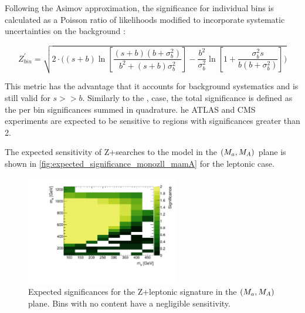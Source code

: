 
Following the Asimov approximation, the significance for individual bins is calculated as a Poisson ratio of likelihoods modified to incorporate systematic uncertainties on the background \cite{Cowan:2012}:  

\begin{equation}
\label{eq:significance_wsyst}
Z^\prime_{bin} = \sqrt{ 2 \cdot \bigg( (s+b) \ln[\frac{ (s+b) (b+\sigma_b^2) } {b^2 + (s+b) \sigma_b^2} ]- \frac{b^2}{\sigma_b^2} \ln[1 + \frac{\sigma_b^2 s}{b(b+\sigma_b^2)} ] \bigg) }
\end{equation}

This metric has the advantage that it accounts for background systematics and is still valid for $s >> b$.  
Similarly to the \monohbb, case, the total significance is defined as the per bin significances summed in quadrature.
 he ATLAS and CMS experiments are expected to be sensitive to regions with significances greater than 2.
 
The expected sensitivity of Z+\MET searches to the \hdma model in the $(M_{a},M_{A})$ plane is shown in \autoref{fig:expected_significance_monozll_mamA} for the leptonic case.

\begin{figure}
\centering
\includegraphics[width=0.6\textwidth]{texinputs/04_grid/figures/monoz/leptonic/mAma_Significance_ll.pdf}
\caption{Expected significances for the Z+\MET leptonic signature in the $(M_{a},M_{A})$ plane. Bins with no content have a negligible sensitivity.} 
\label{fig:expected_significance_monozll_mamA}
\end{figure}

